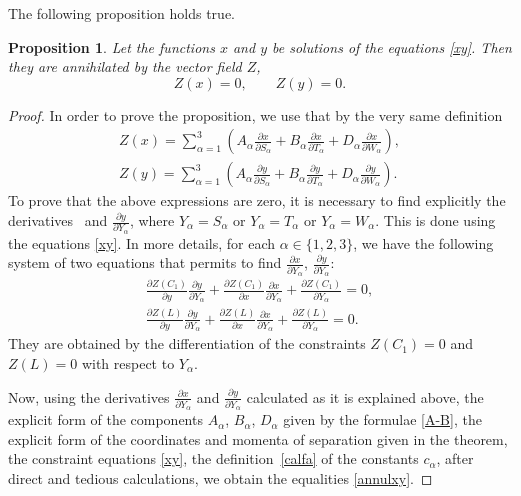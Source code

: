 \documentclass[10pt,a4paper]{amsart}
\def\a{\alpha}
\numberwithin{equation}{section}
\newtheorem{Proposition}[Theorem]{Proposition}
\begin{document}
The following proposition holds true.
\begin{Proposition}\label{Zxynul}
Let the functions $x$ and $y$ be solutions of the equations \eqref{xy}. Then they are annihilated by the vector field $Z$,
\begin{equation}\label{annulxy}
Z(x)=0, \qquad Z(y)=0.
\end{equation}
\end{Proposition}
 \begin{proof}
 In order to prove the proposition, we use that by the very same definition
\begin{gather*}
Z(x)= \sum\limits_{\a=1}^3\left( A_{\a}\frac{\partial x}{ \partial S_{\a}}+
B_{\a}\frac{\partial x}{ \partial T_{\a}}+ D_{\a}\frac{\partial x}{ \partial W_{\a}}\right), \\
Z(y)= \sum\limits_{\a=1}^3\left( A_{\a}\frac{\partial y}{ \partial S_{\a}}+
B_{\a}\frac{\partial y}{ \partial T_{\a}}+ D_{\a}\frac{\partial y}{ \partial W_{\a}}\right).
\end{gather*}
To prove that the above expressions are zero, it is necessary to find explicitly the derivatives~\smash{$\frac{\partial x}{\partial Y_{ \a}}$} and $\frac{\partial y}{\partial Y_{ \a}}$, where $Y_{\a}=S_{\a}$ or $Y_{\a}=T_{\a}$ or $Y_{\a}=W_{\a}$.
 This is done using the equations \eqref{xy}. In more details, for each $\a\in \{1,2,3\}$, we have the following system of two equations that permits to find $\frac{\partial x}{\partial Y_{ \a}}$, $\frac{\partial y}{\partial Y_{ \a}}$:
 \begin{gather*}
 \frac{\partial Z(C_1)}{\partial y} \frac{\partial y}{\partial Y_{ \a}}+ \frac{\partial Z(C_1)}{\partial x} \frac{\partial x}{\partial Y_{ \a}}+ \frac{\partial Z(C_1)}{\partial Y_{ \a}}=0,
\\
 \frac{\partial Z(L)}{\partial y} \frac{\partial y}{\partial Y_{ \a}}+ \frac{\partial Z(L)}{\partial x} \frac{\partial x}{\partial Y_{ \a}}+ \frac{\partial Z(L)}{\partial Y_{ \a}}=0.
 \end{gather*}
 They are obtained by the differentiation of the constraints $Z(C_1)=0$ and $Z(L)=0$ with respect to $Y_{ \a}$.%

Now, using the derivatives $\frac{\partial x}{\partial Y_{ \a}}$ and $\frac{\partial y}{\partial Y_{ \a}}$ calculated as it is explained above, the explicit form of the components $A_{\a}$, $B_{\a}$, $D_{\a}$ given by the formulae \eqref{A-B}, the explicit form of the coordinates and momenta of separation given in the theorem, the constraint equations \eqref{xy}, the definition~\eqref{calfa} of the constants $c_{\a}$, after direct and tedious calculations, we obtain the equalities \eqref{annulxy}.
\end{proof}
\end{document}
